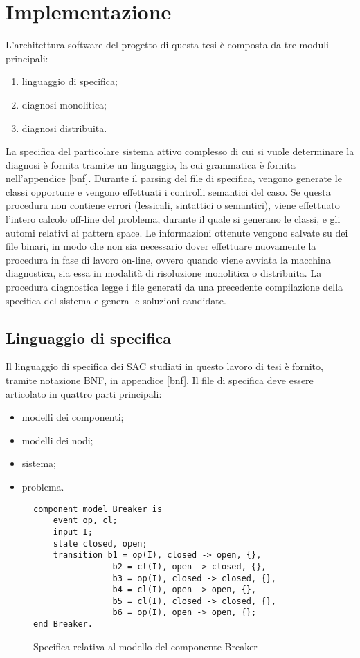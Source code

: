 \chapter{Implementazione}
L'architettura software del progetto di questa tesi è composta da tre moduli principali:
\begin{enumerate}
\item linguaggio di specifica;
\item diagnosi monolitica;
\item diagnosi distribuita.
\end{enumerate}
La specifica del particolare sistema attivo complesso di cui si vuole determinare la diagnosi è fornita tramite un linguaggio, la cui grammatica è fornita nell'appendice \ref{bnf}.
Durante il parsing del file di specifica, vengono generate le classi opportune e vengono effettuati i controlli semantici del caso. Se questa procedura non contiene errori (lessicali, sintattici o semantici), viene effettuato l'intero calcolo off-line del problema, durante il quale si generano le classi, e gli automi relativi ai pattern space. Le informazioni ottenute vengono salvate su dei file binari, in modo che non sia necessario dover effettuare nuovamente la procedura in fase di lavoro on-line, ovvero quando viene avviata la macchina diagnostica, sia essa in modalità di risoluzione monolitica o distribuita. 
La procedura diagnostica legge i file generati da una precedente compilazione della specifica del sistema e genera le soluzioni candidate. 

\section{Linguaggio di specifica}
Il linguaggio di specifica dei SAC studiati in questo lavoro di tesi è fornito, tramite notazione BNF, in appendice \ref{bnf}. 
Il file di specifica deve essere articolato in quattro parti principali:
\begin{itemize}
\item modelli dei componenti;
\item modelli dei nodi;
\item sistema;
\item problema.
\end{itemize}


\begin{figure}[htbp]
\begin{verbatim}
component model Breaker is
	event op, cl;
	input I;
	state closed, open;
	transition b1 = op(I), closed -> open, {},
				b2 = cl(I), open -> closed, {},
				b3 = op(I), closed -> closed, {},
				b4 = cl(I), open -> open, {},
				b5 = cl(I), closed -> closed, {},
				b6 = op(I), open -> open, {};
end Breaker.
\end{verbatim}
\caption{Specifica relativa al modello del componente Breaker}
\label{fig:spec_breaker}
\end{figure}


